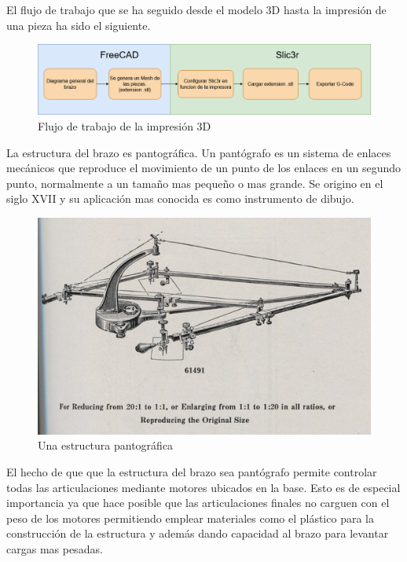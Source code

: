 El flujo de trabajo que se ha seguido desde el modelo 3D hasta la impresión de una pieza ha sido el siguiente.

\begin{figure}[H]
    \centering
    \includegraphics[width=.9\linewidth]{pictures/flujo_trabajo_impresion.png}
    \caption{Flujo de trabajo de la impresión 3D}
    \label{fig:flujo_3d}
\end{figure}

La estructura del brazo es pantográfica. Un pantógrafo es un sistema de enlaces mecánicos que reproduce el movimiento de un punto de los enlaces en un segundo punto, normalmente a un tamaño mas pequeño o mas grande. Se origino en el siglo XVII y su aplicación mas conocida es como instrumento de dibujo. 

\begin{figure}[H]
    \centering
    \includegraphics[width=.9\linewidth]{pictures/link-to-elliott-p149-suspended-pantograph-sf0.jpg}
    \caption{Una estructura pantográfica}
    \label{fig:flujo_3d}
\end{figure}

El hecho de que que la estructura del brazo sea pantógrafo permite controlar todas las articulaciones mediante motores ubicados en la base. Esto es de especial importancia ya que hace posible que las articulaciones finales no carguen con el peso de los motores permitiendo emplear materiales como el plástico para la construcción de la estructura y además dando capacidad al brazo para levantar cargas mas pesadas.





